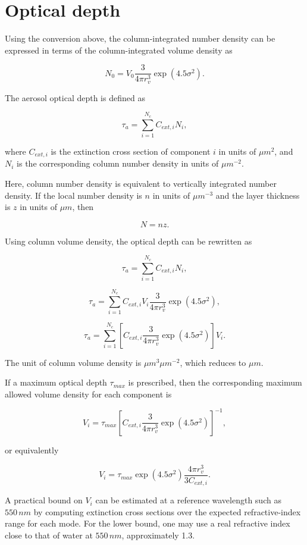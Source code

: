 \documentclass[
  letterpaper,
  open=any]{scrbook}
\begin{document}
\section{Optical depth}\label{optical-depth}

Using the conversion above, the column-integrated number density can be
expressed in terms of the column-integrated volume density as

\[
N_{0}=V_{0} \frac{3}{4 \pi r_{v}^3}\exp(4.5 \sigma^2).
\]

The aerosol optical depth is defined as

\[
\tau_a=\sum_{i=1}^{N_c} C_{ext,i} N_i,
\]

where \(C_{ext,i}\) is the extinction cross section of component \(i\)
in units of \(\mu m^2\), and \(N_i\) is the corresponding column number
density in units of \(\mu m^{-2}\).

Here, column number density is equivalent to vertically integrated
number density. If the local number density is \(n\) in units of
\(\mu m^{-3}\) and the layer thickness is \(z\) in units of \(\mu m\),
then

\[
N = n z.
\]

Using column volume density, the optical depth can be rewritten as

\[
\tau_a = \sum_{i=1}^{N_c} C_{ext,i} N_i,
\]

\[
\tau_a = \sum_{i=1}^{N_c} C_{ext,i} V_i \frac{3}{4 \pi r_{v}^3}\exp(4.5 \sigma^2),
\]

\[
\tau_a = \sum_{i=1}^{N_c} \left[C_{ext,i} \frac{3}{4 \pi r_{v}^3}\exp(4.5 \sigma^2)\right] V_i.
\]

The unit of column volume density is \(\mu m^3 \mu m^{-2}\), which
reduces to \(\mu m\).

If a maximum optical depth \(\tau_{max}\) is prescribed, then the
corresponding maximum allowed volume density for each component is

\[
V_i=\tau_{max}\left[C_{ext,i} \frac{3}{4 \pi r_{v}^3}\exp(4.5 \sigma^2)\right]^{-1},
\]

or equivalently

\[
V_i=\tau_{max} \exp(4.5 \sigma^2) \frac{4 \pi r_{v}^3}{3 C_{ext,i}}.
\]

A practical bound on \(V_i\) can be estimated at a reference wavelength
such as \(550 \, nm\) by computing extinction cross sections over the
expected refractive-index range for each mode. For the lower bound, one
may use a real refractive index close to that of water at \(550 \, nm\),
approximately 1.3.
\end{document}
